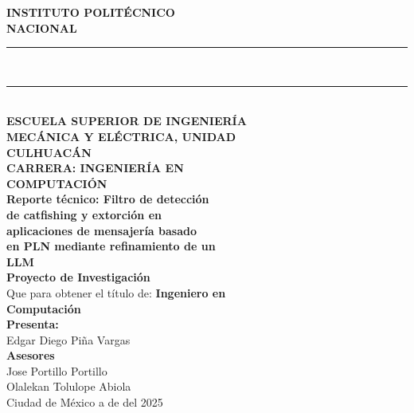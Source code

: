 \documentclass[12pt,letterpaper]{article}
\begin{document}
\hspace*{3.5cm}
\parbox{12cm}{
    \begin{center}
    
    \vspace*{0.8cm}
    
    {\LARGE \textbf{INSTITUTO POLITÉCNICO}}\\[0.2cm]
    {\LARGE \textbf{NACIONAL}}\\[0.3cm]
    
    \rule{10cm}{0.5pt}\\[0.1cm]
    \rule{10cm}{0.5pt}\\[0.6cm]
    
    {\normalsize \textbf{ESCUELA SUPERIOR DE INGENIERÍA}}\\[0.1cm]
    {\normalsize \textbf{MECÁNICA Y ELÉCTRICA, UNIDAD}}\\[0.1cm]
    {\normalsize \textbf{CULHUACÁN}}\\[0.8cm]
    
    {\small \textbf{CARRERA: INGENIERÍA EN}}\\[0.1cm]
    {\small \textbf{COMPUTACIÓN}}\\[1cm]
    
    {\large \textbf{Reporte técnico: Filtro de detección}}\\[0.15cm]
    {\large \textbf{de catfishing y extorción en}}\\[0.15cm]
    {\large \textbf{aplicaciones de mensajería basado}}\\[0.15cm]
    {\large \textbf{en PLN mediante refinamiento de un}}\\[0.15cm]
    {\large \textbf{LLM}}\\[1cm]
    
    {\normalsize \textbf{Proyecto de Investigación}}\\[1cm]
    
    {\small Que para obtener el título de: \textbf{Ingeniero en}}\\[0.1cm]
    {\small \textbf{Computación}}\\[0.8cm]
    
    {\small \textbf{Presenta:}}\\[0.2cm]
    {\small Edgar Diego Piña Vargas}\\[1cm]
    
    {\small \textbf{Asesores}}\\[0.2cm]
    {\small Jose Portillo Portillo}\\[0.1cm]
    {\small Olalekan Tolulope Abiola}\\[1cm]
    
    {\small Ciudad de México a \underline{\hspace{1cm}} de \underline{\hspace{2cm}} del 2025}
    
    \end{center}
}
\end{document}
